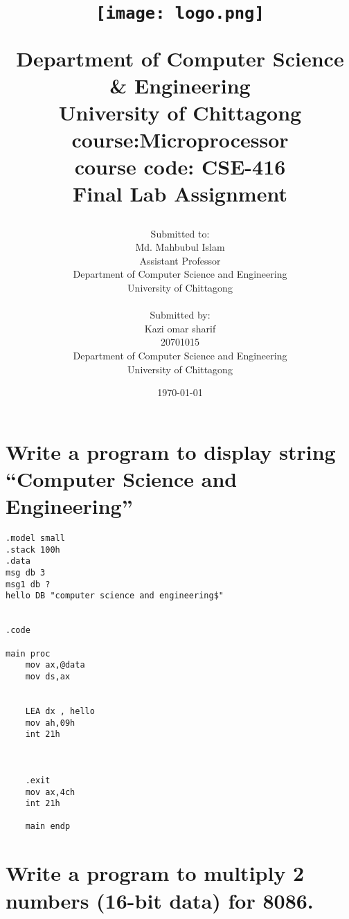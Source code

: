 \documentclass{article}
\title{
\begin{center}
\texttt{[image: logo.png]}
\end{center}

Department of Computer Science \& Engineering \\
\large{
University of Chittagong \\
course:Microprocessor \\
course code: CSE-416 \\
Final Lab Assignment
}
\author{Submitted to: \\
Md. Mahbubul Islam \\
Assistant Professor \\
Department of Computer Science and Engineering \\
University of Chittagong \\
\\
Submitted by: \\
Kazi omar sharif \\
20701015 \\
Department of Computer Science and Engineering \\
University of Chittagong} 

\date{\today} %

}
\begin{document}
\maketitle

\newpage


\section{Write a program to display string “Computer Science and Engineering”} 

\begin{lstlisting}[style=asmStyle]
 .model small
.stack 100h
.data 
msg db 3
msg1 db ?  
hello DB "computer science and engineering$"
    

.code

main proc 
    mov ax,@data
    mov ds,ax 
      
      
    LEA dx , hello  
    mov ah,09h
    int 21h 
    
    
  
    .exit
    mov ax,4ch
    int 21h
    
    main endp

\end{lstlisting}


\section{Write a program to multiply 2 numbers (16-bit data) for 8086.} 
\end{document}
